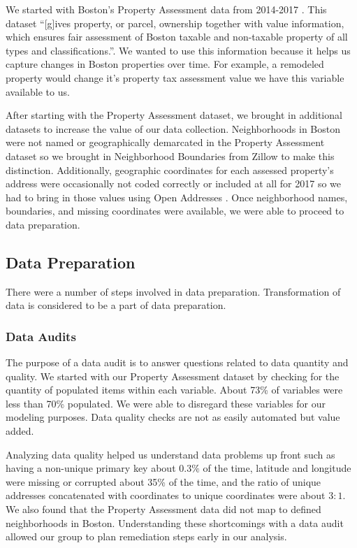 \documentclass[12pt]{article}
\begin{document}
We started with Boston's Property Assessment data from 2014-2017
\cite{Property49:online}. This dataset ``[g]ives property, or parcel,
ownership together with value information, which ensures fair assessment
of Boston taxable and non-taxable property of all types and
classifications.''\cite{Property49:online}. We wanted to use this
information because it helps us capture changes in Boston properties
over time. For example, a remodeled property would change it's property
tax assessment value we have this variable available to us.

After starting with the Property Assessment dataset, we brought in
additional datasets to increase the value of our data collection.
Neighborhoods in Boston were not named or geographically demarcated in
the Property Assessment dataset so we brought in Neighborhood Boundaries
from Zillow \cite{ZillowNe81:online} to make this distinction.
Additionally, geographic coordinates for each assessed property's address
were occasionally not coded correctly or included at all for 2017 so we 
had to bring in those values using Open Addresses
\cite{OpenAddr24:online}. Once neighborhood names, boundaries, and missing
coordinates were available, we were able to proceed to data preparation.

\subsection{Data Preparation}

There were a number of steps involved in data preparation. Transformation
of data is considered to be a part of data preparation.

\subsubsection{Data Audits}

The purpose of a data audit is to answer questions related to data
quantity and quality. We started with our Property Assessment dataset
by checking for the quantity of populated items within each variable.
About 73\% of variables were less than 70\% populated. We were able to
disregard these variables for our modeling purposes. Data quality checks
are not as easily automated but value added.

Analyzing data quality helped us understand data problems up front
such as having a non-unique primary key about $0.3\%$ of the time,
latitude and longitude were missing or corrupted about 35\% of the time,
and the ratio of unique addresses concatenated with coordinates to
unique coordinates were about $3:1$. We also found that the Property
Assessment data did not map to defined neighborhoods in Boston.
Understanding these shortcomings with a data audit allowed our group
to plan remediation steps early in our analysis.
\end{document}
